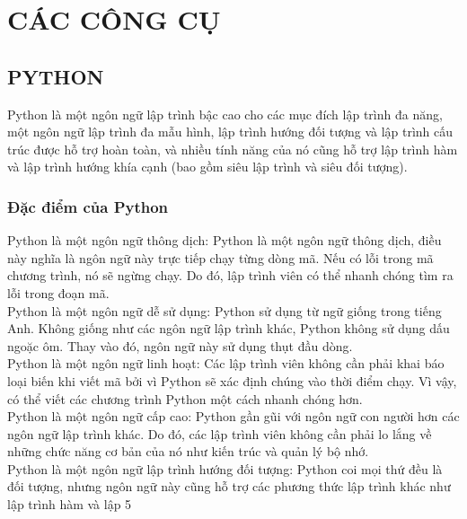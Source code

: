 \documentclass[a4paper]{article}
\begin{document}
\section{CÁC CÔNG CỤ}
\subsection{PYTHON}
    Python là một ngôn ngữ lập trình bậc cao cho các mục đích lập trình đa năng, một ngôn ngữ lập trình đa mẫu hình, lập trình hướng đối tượng và lập trình cấu trúc được hỗ trợ hoàn toàn, và nhiều tính năng của nó cũng hỗ trợ lập trình hàm và lập trình hướng khía cạnh (bao gồm siêu lập trình và siêu đối tượng).
\subsubsection{Đặc điểm của Python}
\indent Python là một ngôn ngữ thông dịch: Python là một ngôn ngữ thông dịch, điều này nghĩa là ngôn ngữ này trực tiếp chạy từng dòng mã. Nếu có lỗi trong mã chương trình, nó sẽ ngừng chạy. Do đó, lập trình viên có thể nhanh chóng tìm ra lỗi trong đoạn mã.
\\
\indent Python là một ngôn ngữ dễ sử dụng: Python sử dụng từ ngữ giống trong tiếng Anh. Không giống như các ngôn ngữ lập trình khác, Python không sử dụng dấu ngoặc ôm. Thay vào đó,
ngôn ngữ này sử dụng thụt đầu dòng.
\\
\indent Python là một ngôn ngữ linh hoạt: Các lập trình viên không cần phải khai báo loại biến khi viết mã bởi vì Python sẽ xác định chúng vào thời điểm chạy. Vì vậy, có thể viết các chương trình Python một cách nhanh chóng hơn.
\\
\indent Python là một ngôn ngữ cấp cao: Python gần gũi với ngôn ngữ con người hơn các ngôn ngữ lập trình khác. Do đó, các lập trình viên không cần phải lo lắng về những chức năng cơ bản
của nó như kiến trúc và quản lý bộ nhớ.
\\
\indent Python là một ngôn ngữ lập trình hướng đối tượng: Python coi mọi thứ đều là đối tượng, nhưng ngôn ngữ này cũng hỗ trợ các phương thức lập trình khác như lập trình hàm và lập 5
\end{document}
